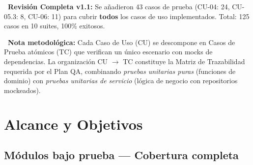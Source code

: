 \documentclass[12pt, a4paper]{article}
\begin{document}
\vspace{8pt}
\begin{alertsuccess}
\textbf{\faCheckCircle\ Revisión Completa v1.1:} Se añadieron 43 casos de prueba (CU-04: 24, CU-05.3: 8, CU-06: 11) para cubrir \textbf{todos} los casos de uso implementados. Total: 125 casos en 10 suites, 100\% exitosos.
\end{alertsuccess}

\vspace{6pt}
\begin{alertinfo}
\textbf{\faInfoCircle\ Nota metodológica:} Cada Caso de Uso (CU) se descompone en Casos de Prueba atómicos (TC) que verifican un único escenario con mocks de dependencias. La organización CU $\to$ TC constituye la Matriz de Trazabilidad requerida por el Plan QA, combinando \textit{pruebas unitarias puras} (funciones de dominio) con \textit{pruebas unitarias de servicio} (lógica de negocio con repositorios mockeados).
\end{alertinfo}

\newpage

\section{Alcance y Objetivos}

\subsection{Módulos bajo prueba — Cobertura completa}
\end{document}
